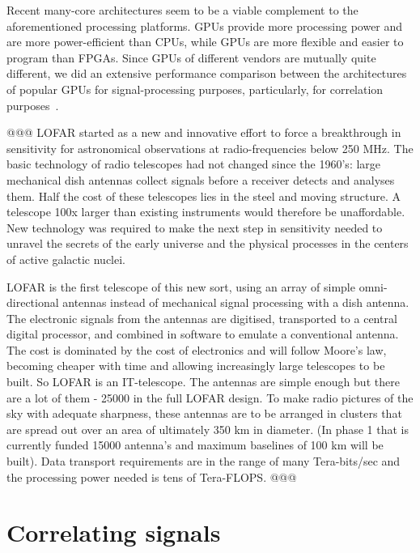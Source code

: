 \documentclass{article}
\begin{document}
Recent many-core architectures seem to be a viable complement to the aforementioned processing platforms.
GPUs provide more processing power and are more power-efficient than CPUs,
while GPUs are more flexible and easier to program than FPGAs.
Since GPUs of different vendors are mutually quite different, we did an
extensive performance comparison between the architectures of popular GPUs 
for signal-processing purposes, particularly, for correlation
purposes~\cite{Nieuwpoort:09}.





@@@
LOFAR started as a new and innovative effort to force a breakthrough
in sensitivity for astronomical observations at radio-frequencies
below 250 MHz. The basic technology of radio telescopes had not
changed since the 1960's: large mechanical dish antennas collect
signals before a receiver detects and analyses them. Half the cost of
these telescopes lies in the steel and moving structure. A telescope
100x larger than existing instruments would therefore be
unaffordable. New technology was required to make the next step in
sensitivity needed to unravel the secrets of the early universe and
the physical processes in the centers of active galactic nuclei.

LOFAR is the first telescope of this new sort, using an array of
simple omni-directional antennas instead of mechanical signal
processing with a dish antenna. The electronic signals from the
antennas are digitised, transported to a central digital processor,
and combined in software to emulate a conventional antenna. The cost
is dominated by the cost of electronics and will follow Moore's law,
becoming cheaper with time and allowing increasingly large telescopes
to be built. So LOFAR is an IT-telescope. The antennas are simple
enough but there are a lot of them - 25000 in the full LOFAR
design. To make radio pictures of the sky with adequate sharpness,
these antennas are to be arranged in clusters that are spread out over
an area of ultimately 350 km in diameter. (In phase 1 that is
currently funded 15000 antenna's and maximum baselines of 100 km will
be built). Data transport requirements are in the range of many
Tera-bits/sec and the processing power needed is tens of Tera-FLOPS.
@@@

\section{Correlating signals}
\end{document}

